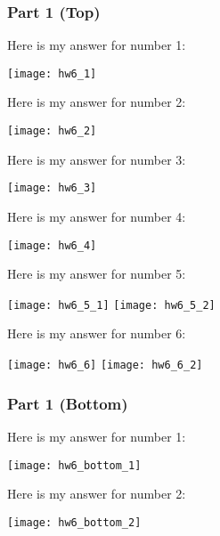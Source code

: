\documentclass{article}
\theoremstyle{theorem}
\theoremstyle{definition}
\theoremstyle{remark}
\begin{document}
\subsubsection{Part 1 (Top)}
\noindent\newline Here is my answer for number 1:

\texttt{[image: hw6\_1]}\noindent\newline

\noindent\newline Here is my answer for number 2:

\texttt{[image: hw6\_2]}\noindent\newline

\noindent\newline Here is my answer for number 3:

\texttt{[image: hw6\_3]}\noindent\newline

\noindent\newline Here is my answer for number 4:

\texttt{[image: hw6\_4]}\noindent\newline

\noindent\newline Here is my answer for number 5:

\texttt{[image: hw6\_5\_1]}\noindent\newline
\texttt{[image: hw6\_5\_2]}\noindent\newline

\noindent\newline Here is my answer for number 6:

\texttt{[image: hw6\_6]}\noindent\newline
\texttt{[image: hw6\_6\_2]}\noindent\newline

\subsubsection{Part 1 (Bottom)}
\noindent\newline Here is my answer for number 1:

\texttt{[image: hw6\_bottom\_1]}\noindent\newline

\noindent\newline Here is my answer for number 2:

\texttt{[image: hw6\_bottom\_2]}\noindent\newline
\end{document}
